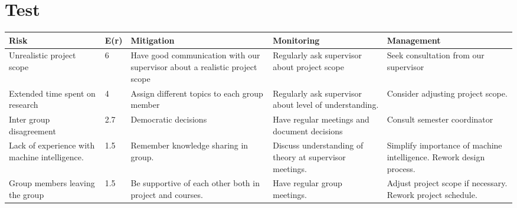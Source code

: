 \chapter{Test}
\begin{center}
    \begin{longtable}[htbp]{| p{27mm} | l | p{27mm} | p{27mm} | p{27mm} |}
        \hline
        \textbf{Risk} & \textbf{E(r)} & \textbf{Mitigation} & \textbf{Monitoring} & \textbf{Management} \\ 
        \hline
        Unrealistic \newline project scope & 6 & Have good \newline communication \newline with our \newline supervisor about \newline a realistic project \newline scope & Regularly ask \newline supervisor about project scope & Seek \newline consultation from our \newline supervisor \\
        \hline
        Extended time \newline spent on \newline research & 4 & Assign different topics to each group member & Regularly ask supervisor about level of understanding. & Consider adjusting project scope. \\
        \hline
        Inter group \newline disagreement & 2.7 & Democratic \newline decisions & Have regular \newline meetings and \newline document \newline decisions & Consult semester coordinator \\
        \hline
        Lack of \newline experience with \newline machine intelligence. & 1.5 & Remember knowledge sharing in group. & Discuss understanding of theory at supervisor meetings. & Simplify importance of machine intelligence. Rework design process. \\
        \hline
        Group members leaving the group & 1.5 & Be supportive of each other both in project and courses. & Have regular \newline group meetings. & Adjust project \newline scope if necessary. Rework project schedule. \\

\end{longtable}
\end{center}

